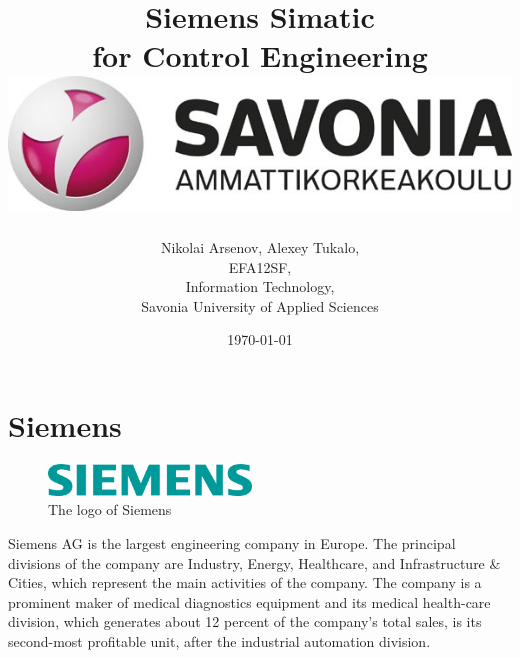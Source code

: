 \documentclass[english]{article}
\date{}
\begin{document}
\title{\vspace{2in}Siemens Simatic\\
\small for Control Engineering\\
\vspace{0.5in}\includegraphics{savonia.jpg}}

\nopagebreak
\maketitle


\vspace{3in}

\author{
\begin{flushright}
Nikolai Arsenov, Alexey Tukalo,\\
EFA12SF,\\
Information Technology,\\
Savonia University of Applied Sciences
\end{flushright}
}

\date{\today}
\thispagestyle{empty}

\newpage
\setcounter{page}{1}
\setcounter{tocdepth}{2}
\tableofcontents

\newpage


\section{Siemens}
\begin{figure}
  \begin{center}
    \includegraphics[width=0.48\textwidth]{SiemensSimantic/Siemens_AG}
  \end{center}
  \caption{The logo of Siemens}
\end{figure}
Siemens AG is the largest engineering company in Europe. The principal divisions of the company are Industry, Energy, Healthcare, and Infrastructure \& Cities, which represent the main activities of the company. The company is a prominent maker of medical diagnostics equipment and its medical health-care division, which generates about 12 percent of the company's total sales, is its second-most profitable unit, after the industrial automation division.\\
\end{document}
